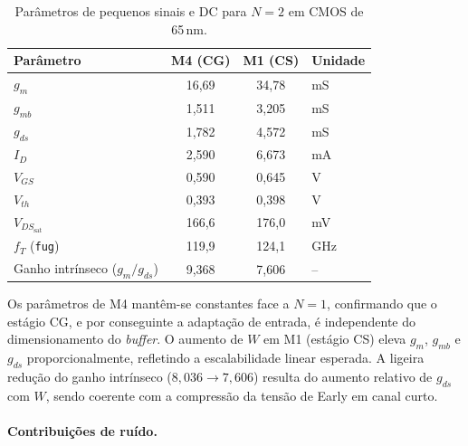 \begin{table}[H]
\centering
\caption{Parâmetros de pequenos sinais e DC para $N=2$ em CMOS de 65\,nm.}
\label{tab:op65_N2}
\begin{tabular}{lccl}
\hline
\textbf{Parâmetro} & \textbf{M4 (CG)} & \textbf{M1 (CS)} & \textbf{Unidade} \\
\hline
$g_m$                           & 16{,}69 & 34{,}78 & mS \\
$g_{mb}$                        & 1{,}511 & 3{,}205 & mS \\
$g_{ds}$                        & 1{,}782 & 4{,}572 & mS \\
$I_D$                           & 2{,}590 & 6{,}673 & mA \\
$V_{GS}$                        & 0{,}590 & 0{,}645 & V  \\
$V_{th}$                        & 0{,}393 & 0{,}398 & V  \\
$V_{DS_{\text{sat}}}$           & 166{,}6 & 176{,}0 & mV \\
$f_T$ (\texttt{fug})            & 119{,}9 & 124{,}1 & GHz \\
Ganho intrínseco ($g_m/g_{ds}$) & 9{,}368 & 7{,}606 & --  \\
\hline
\end{tabular}
\end{table}

Os parâmetros de M4 mantêm-se constantes face a $N=1$, confirmando que o estágio CG, e por
conseguinte a adaptação de entrada, é independente do dimensionamento do \textit{buffer}. O
aumento de $W$ em M1 (estágio CS) eleva $g_m$, $g_{mb}$ e $g_{ds}$ proporcionalmente, refletindo
a escalabilidade linear esperada. A ligeira redução do ganho intrínseco ($8{,}036 \to 7{,}606$)
resulta do aumento relativo de $g_{ds}$ com $W$, sendo coerente com a compressão da tensão de Early
em canal curto.

\paragraph{Contribuições de ruído.}

